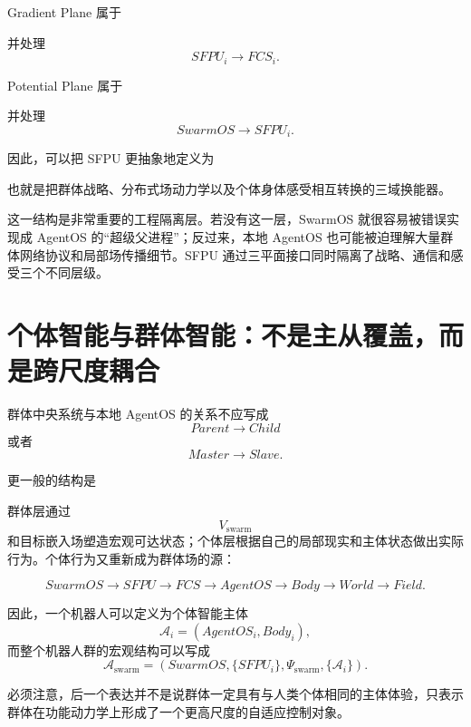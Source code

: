 Gradient Plane 属于
\begin{statementbox}
\centering
{}
\end{statementbox}
并处理
\[
SFPU_i
\rightarrow
FCS_i.
\]

Potential Plane 属于
\begin{statementbox}
\centering
{}
\end{statementbox}
并处理
\[
SwarmOS
\rightarrow
SFPU_i.
\]

因此，可以把 SFPU 更抽象地定义为
\begin{statementbox}
\centering
{}
\end{statementbox}
也就是把群体战略、分布式场动力学以及个体身体感受相互转换的三域换能器。

这一结构是非常重要的工程隔离层。若没有这一层，SwarmOS 就很容易被错误实现成 AgentOS 的“超级父进程”；反过来，本地 AgentOS 也可能被迫理解大量群体网络协议和局部场传播细节。SFPU 通过三平面接口同时隔离了战略、通信和感受三个不同层级。


\section{个体智能与群体智能：不是主从覆盖，而是跨尺度耦合}

群体中央系统与本地 AgentOS 的关系不应写成
\[
Parent
\rightarrow
Child
\]
或者
\[
Master
\rightarrow
Slave.
\]

更一般的结构是
\begin{statementbox}
\centering
{}
\end{statementbox}

群体层通过
\[
V_{\mathrm{swarm}}
\]
和目标嵌入场塑造宏观可达状态；个体层根据自己的局部现实和主体状态做出实际行为。个体行为又重新成为群体场的源：

\[
SwarmOS
\rightarrow
SFPU
\rightarrow
FCS
\rightarrow
AgentOS
\rightarrow
Body
\rightarrow
World
\rightarrow
Field.
\]

因此，一个机器人可以定义为个体智能主体
\[
\mathcal A_i
=
(
AgentOS_i,
Body_i
),
\]
而整个机器人群的宏观结构可以写成
\[
\mathcal A_{\mathrm{swarm}}
=
(
SwarmOS,
\{SFPU_i\},
\Psi_{\mathrm{swarm}},
\{\mathcal A_i\}
).
\]

必须注意，后一个表达并不是说群体一定具有与人类个体相同的主体体验，只表示群体在功能动力学上形成了一个更高尺度的自适应控制对象。

